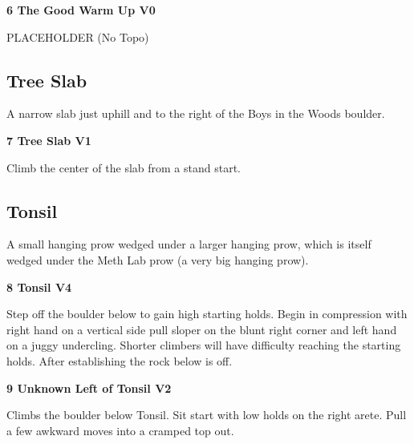 \begin{multicols*}{2}
					\label{rt:The Good Warm Up}\colorbox{green!20}{\textbf{6 The Good Warm Up V0  }}
					\begin{adjustwidth}{0.5cm}{}
					\begin{minipage}{\linewidth}					
					PLACEHOLDER
						\newline (No Topo) 
					\end{minipage}
					\end{adjustwidth}
			\subsection*{Tree Slab}\label{bf:Tree Slab}
			\begin{minipage}{\columnwidth}
			A narrow slab just uphill and to the right of the Boys in the Woods boulder.
			\end{minipage}
			
					\label{rt:Tree Slab}\colorbox{green!20}{\textbf{7 Tree Slab V1 \ding{72}   }}
					\begin{adjustwidth}{0.5cm}{}
					\begin{minipage}{\linewidth}					
					Climb the center of the slab from a stand start.
					\end{minipage}
					\end{adjustwidth}
			\subsection*{Tonsil}\label{bf:Tonsil}
			\begin{minipage}{\columnwidth}
			A small hanging prow wedged under a larger hanging prow, which is itself wedged under the Meth Lab prow (a very big hanging prow).
			\end{minipage}
			
					\label{rt:Tonsil}\colorbox{RoyalBlue!20}{\textbf{8 Tonsil V4    }}
					\begin{adjustwidth}{0.5cm}{}
					\begin{minipage}{\linewidth}					
					Step off the boulder below to gain high starting holds. Begin in compression with right hand on a vertical side pull sloper on the blunt right corner and left hand on a juggy undercling.  Shorter climbers will have difficulty reaching the starting holds. After establishing the rock below is off.
					\end{minipage}
					\end{adjustwidth}
					\label{rt:Unknown Left of Tonsil}\colorbox{green!20}{\textbf{9 Unknown Left of Tonsil V2 \ding{73} }}
					\begin{adjustwidth}{0.5cm}{}
					\begin{minipage}{\linewidth}					
					Climbs the boulder below Tonsil. Sit start with low holds on the right arete. Pull a few awkward moves into a cramped top out.
					\end{minipage}
					\end{adjustwidth}

\end{multicols*}
